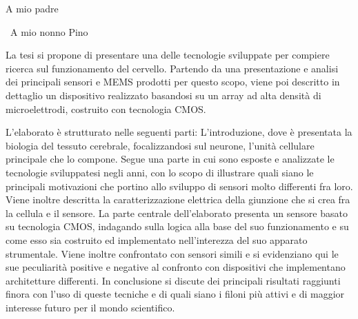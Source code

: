 \documentclass[%
twoside,
oldstyle,
autoretitolo,
greek,
evenboxes,
]{toptesi}
\begin{document}
	
	
	{\tomo
		\paginavuota
		\begin{dedica}
			A mio padre
			
			\textdagger\ A mio nonno Pino
		\end{dedica}
	}{%
		\frontespizio %
	}
	
	\sommario
	La tesi si propone di presentare una delle tecnologie sviluppate per compiere ricerca sul funzionamento del cervello. Partendo da una presentazione e analisi dei principali sensori e MEMS prodotti per questo scopo, viene poi descritto in dettaglio un dispositivo realizzato basandosi su un array ad alta densità di microelettrodi, costruito con tecnologia CMOS.
	
	L’elaborato è strutturato nelle seguenti parti:
	L’introduzione, dove è presentata la biologia del tessuto cerebrale, focalizzandosi sul neurone, l’unità cellulare principale che lo compone. Segue una parte in cui sono esposte e analizzate le tecnologie sviluppatesi negli anni, con lo scopo di illustrare quali siano le principali motivazioni che portino allo sviluppo di sensori molto differenti fra loro. Viene inoltre descritta la caratterizzazione elettrica della giunzione che si crea fra la cellula e il sensore.  
	La parte centrale dell’elaborato presenta un sensore basato su tecnologia CMOS, indagando sulla logica alla base del suo funzionamento e su come esso sia costruito ed implementato nell’interezza del suo apparato strumentale. Viene inoltre confrontato con sensori simili e si evidenziano qui le sue peculiarità positive e negative al confronto con dispositivi che implementano architetture differenti.
	In conclusione si discute dei principali risultati raggiunti finora con l’uso di queste tecniche e di quali siano i filoni più attivi e di maggior interesse futuro per il mondo scientifico. 
	
\end{document}
